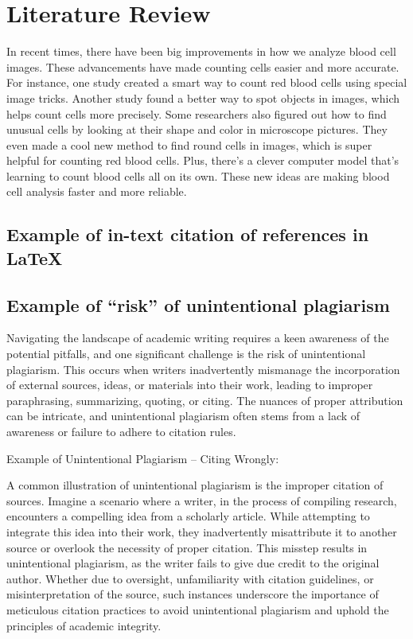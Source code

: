 \chapter{Literature Review}
\label{ch:lit_rev} %

In recent times, there have been big improvements in how we analyze blood cell images.
These advancements have made counting cells easier and more accurate. For instance, one
study created a smart way to count red blood cells using special image tricks. Another study
found a better way to spot objects in images, which helps count cells more precisely. Some
researchers also figured out how to find unusual cells by looking at their shape and color in
microscope pictures. They even made a cool new method to find round cells in images, which
is super helpful for counting red blood cells. Plus, there's a clever computer model that's
learning to count blood cells all on its own. These new ideas are making blood cell analysis
faster and more reliable.


\section{Example of in-text citation of references in \LaTeX} 
\cite{alomari2014automatic}


\section{Example of ``risk'' of unintentional plagiarism}
Navigating the landscape of academic writing requires a keen awareness of the potential pitfalls, and one significant challenge is the risk of unintentional plagiarism. This occurs when writers inadvertently mismanage the incorporation of external sources, ideas, or materials into their work, leading to improper paraphrasing, summarizing, quoting, or citing. The nuances of proper attribution can be intricate, and unintentional plagiarism often stems from a lack of awareness or failure to adhere to citation rules.

Example of Unintentional Plagiarism – Citing Wrongly:

A common illustration of unintentional plagiarism is the improper citation of sources. Imagine a scenario where a writer, in the process of compiling research, encounters a compelling idea from a scholarly article. While attempting to integrate this idea into their work, they inadvertently misattribute it to another source or overlook the necessity of proper citation. This misstep results in unintentional plagiarism, as the writer fails to give due credit to the original author. Whether due to oversight, unfamiliarity with citation guidelines, or misinterpretation of the source, such instances underscore the importance of meticulous citation practices to avoid unintentional plagiarism and uphold the principles of academic integrity.



